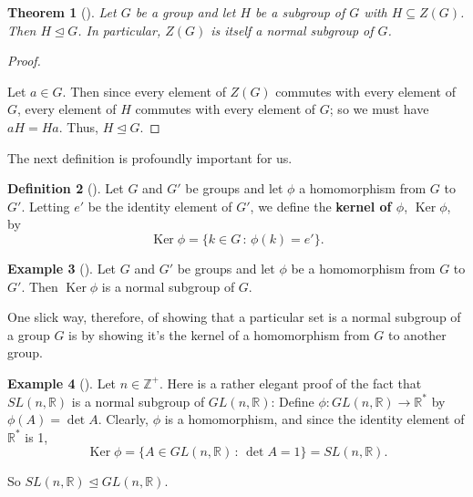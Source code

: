 \documentclass[10pt,]{book}
\newcommand{\terminology}[1]{\textbf{#1}}
\theoremstyle{plain}
\newtheorem{theorem}{Theorem}[section]
\theoremstyle{definition}
\newtheorem{definition}[theorem]{Definition}
\theoremstyle{definition}
\theoremstyle{definition}
\newtheorem{example}[theorem]{Example}
\theoremstyle{definition}
\numberwithin{equation}{section}
\def\Z{\mathbb{Z}}
\def\R{\mathbb{R}}
\DeclareMathOperator{\Ker}{Ker}
\begin{document}
\begin{theorem}[{}]\label{znorm}
Let \(G\) be a group and let \(H\) be a subgroup of \(G\) with \(H\subseteq Z(G)\). Then \(H\unlhd G\). In particular, \(Z(G)\) is itself a normal subgroup of \(G\).%
\end{theorem}
\begin{proof}\hypertarget{proof-44}{}
Let \(a\in G\). Then since every element of \(Z(G)\) commutes with every element of \(G\), every element of \(H\) commutes with every element of \(G\); so we must have \(aH=Ha\). Thus, \(H\unlhd G\).%
\end{proof}
The next definition is profoundly important for us.%
\begin{definition}[{}]\label{definition-68}
Let \(G\) and \(G'\) be groups and let \(\phi\) a homomorphism from \(G\) to \(G'\). Letting \(e'\) be the identity element of \(G'\), we define the \terminology{kernel of \(\phi\)}, \(\Ker
\phi\), by%
\begin{equation*}
\Ker \phi = \{k\in G\,:\,\phi(k)=e'\}.
\end{equation*}
%
\label{notation-41}
\end{definition}
\begin{example}[]\label{example-79}
Let \(G\) and \(G'\) be groups and let \(\phi\) be a homomorphism from \(G\) to \(G'\). Then \(\Ker \phi\) is a normal subgroup of \(G\).%
\end{example}
One slick way, therefore, of showing that a particular set is a normal subgroup of a group \(G\) is by showing it's the kernel of a homomorphism from \(G\) to another group.%
\begin{example}[]\label{slnormgl}
Let \(n\in \Z^+\). Here is a rather elegant proof of the fact that \(SL(n,\R)\) is a normal subgroup of \(GL(n,\R)\): Define \(\phi:
GL(n,\R) \to \R^*\) by \(\phi(A)=\det A\). Clearly, \(\phi\) is a homomorphism, and since the identity element of \(\R^*\) is 1,%
\begin{equation*}
\Ker \phi=\{A\in GL(n,\R)\,:\,\det A= 1\}=SL(n,\R).
\end{equation*}
%
\par
So \(SL(n,\R)\unlhd GL(n,\R)\).%
\end{example}
\typeout{************************************************}
\typeout{************************************************}
\end{document}
